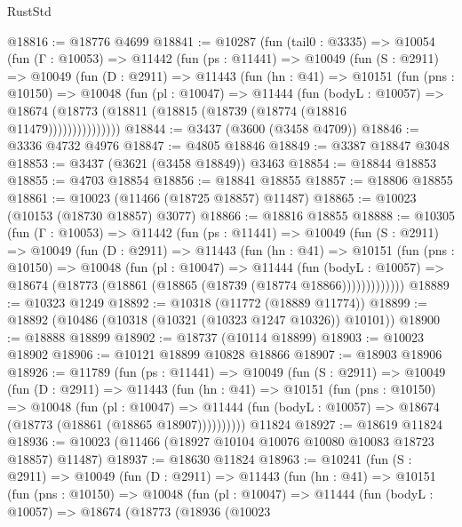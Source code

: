 \begin{lexlean}{RustStd}
\begin{coremodule}
@18816 := @18776 @4699
@18841 := @10287
    (fun (tail0 : @3335) =>
    @10054
      (fun (Γ : @10053) =>
      @11442
        (fun (ps : @11441) =>
        @10049
          (fun (S : @2911) =>
          @10049
            (fun (D : @2911) =>
            @11443
              (fun (hn : @41) =>
              @10151
                (fun (pns : @10150) =>
                @10048
                  (fun (pl : @10047) =>
                  @11444
                    (fun (bodyL : @10057) =>
                    @18674 (@18773 (@18811 (@18815 (@18739 (@18774 (@18816 @11479)))))))))))))))
@18844 := @3437 (@3600 (@3458 @4709))
@18846 := @3336 @4732 @4976
@18847 := @4805 @18846
@18849 := @3387 @18847 @3048
@18853 := @3437 (@3621 (@3458 @18849)) @3463
@18854 := @18844 @18853
@18855 := @4703 @18854
@18856 := @18841 @18855
@18857 := @18806 @18855
@18861 := @10023 (@11466 (@18725 @18857) @11487)
@18865 := @10023 (@10153 (@18730 @18857) @3077)
@18866 := @18816 @18855
@18888 := @10305
    (fun (Γ : @10053) =>
    @11442
      (fun (ps : @11441) =>
      @10049
        (fun (S : @2911) =>
        @10049
          (fun (D : @2911) =>
          @11443
            (fun (hn : @41) =>
            @10151
              (fun (pns : @10150) =>
              @10048
                (fun (pl : @10047) =>
                @11444
                  (fun (bodyL : @10057) =>
                  @18674 (@18773 (@18861 (@18865 (@18739 (@18774 @18866)))))))))))))
@18889 := @10323 @1249
@18892 := @10318 (@11772 (@18889 @11774))
@18899 := @18892 (@10486 (@10318 (@10321 (@10323 @1247 @10326)) @10101))
@18900 := @18888 @18899
@18902 := @18737 (@10114 @18899)
@18903 := @10023 @18902
@18906 := @10121 @18899 @10828 @18866
@18907 := @18903 @18906
@18926 := @11789
    (fun (ps : @11441) =>
    @10049
      (fun (S : @2911) =>
      @10049
        (fun (D : @2911) =>
        @11443
          (fun (hn : @41) =>
          @10151
            (fun (pns : @10150) =>
            @10048
              (fun (pl : @10047) =>
              @11444 (fun (bodyL : @10057) => @18674 (@18773 (@18861 (@18865 @18907))))))))))
    @11824
@18927 := @18619 @11824
@18936 := @10023 (@11466 (@18927 @10104 @10076 @10080 @10083 @18723 @18857) @11487)
@18937 := @18630 @11824
@18963 := @10241
    (fun (S : @2911) =>
    @10049
      (fun (D : @2911) =>
      @11443
        (fun (hn : @41) =>
        @10151
          (fun (pns : @10150) =>
          @10048
            (fun (pl : @10047) =>
            @11444
              (fun (bodyL : @10057) =>
              @18674
                (@18773
                  (@18936
                    (@10023

\end{coremodule}
\end{lexlean}
